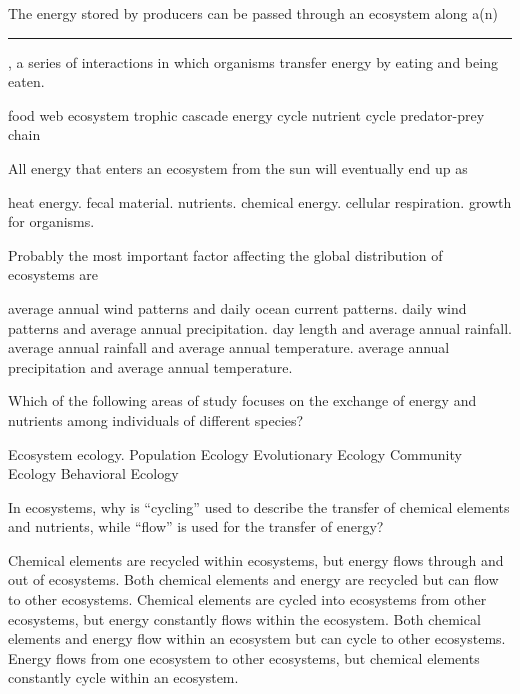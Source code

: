 \question
The energy stored by producers can be passed through an ecosystem along a(n) \rule{1in}{0.4pt}, a series of interactions in which organisms transfer energy by eating and being eaten.

\begin{choices}
\correctchoice food web %
\choice ecosystem %
\choice trophic cascade %
\choice energy cycle %
\choice nutrient cycle %
\choice predator-prey chain  %
\end{choices}



\question
All energy that enters an ecosystem from the sun will eventually end up as

\begin{choices}
\correctchoice heat energy. %
\choice fecal material. %
\choice nutrients. %
\choice chemical energy. %
\choice cellular respiration. %
\choice growth for organisms. %
\end{choices}

\question
Probably the most important factor affecting the global distribution of ecosystems are

\begin{choices}
\choice average annual wind patterns and daily ocean current patterns. %
\choice daily wind patterns and average annual precipitation. %
\choice day length and average annual rainfall. %
\choice average annual rainfall and average annual temperature. %
\correctchoice average annual precipitation and average annual temperature. %
\end{choices}


\question
Which of the following areas of study focuses on the exchange of energy and nutrients among individuals of different species?

\begin{choices}
\correctchoice Ecosystem ecology. %
\choice Population Ecology %
\choice Evolutionary Ecology %
\choice Community Ecology %
\choice Behavioral Ecology %
\end{choices}

\question
In ecosystems, why is ``cycling'' used to describe the transfer of chemical elements and nutrients, while ``flow'' is used for the transfer of energy?

\begin{choices}
\correctchoice Chemical elements are recycled within ecosystems, but energy flows through and out of ecosystems.%
\choice Both chemical elements and energy are recycled but can flow to other ecosystems.%
\choice Chemical elements are cycled into ecosystems from other ecosystems, but energy constantly flows within the ecosystem.%
\choice Both chemical elements and energy flow within an ecosystem but can cycle to other ecosystems.%
\choice Energy flows from one ecosystem to other ecosystems, but chemical elements constantly cycle within an ecosystem.%
\end{choices}

